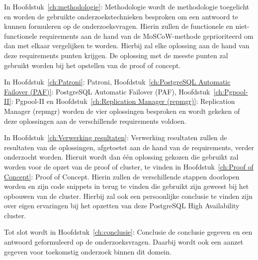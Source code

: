 In Hoofdstuk~\ref{ch:methodologie}: Methodologie wordt de methodologie toegelicht en worden de gebruikte onderzoekstechnieken besproken om een antwoord te kunnen formuleren op de onderzoeksvragen. Hierin zullen de functionele en niet-functionele requirements aan de hand van de MoSCoW-methode geprioriteerd om dan met elkaar vergelijken te worden. Hierbij zal elke oplossing aan de hand van deze requirements punten krijgen. De oplossing met de meeste punten zal gebruikt worden bij het opstellen van de proof of concept.

In Hoofdstuk~\ref{ch:Patroni}: Patroni, Hoofdstuk~\ref{ch:PostgreSQL Automatic Failover (PAF)}: PostgreSQL Automatic Failover (PAF), Hoofdstuk~\ref{ch:Pgpool-II}: Pgpool-II en Hoofdstuk~\ref{ch:Replication Manager (repmgr)}: Replication Manager (repmgr) worden de vier oplossingen besproken en wordt gekeken of deze oplossingen aan de verschillende requirements voldoen.

In Hoofdstuk~\ref{ch:Verwerking resultaten}: Verwerking resultaten zullen de resultaten van de oplossingen, afgetoetst aan de hand van de requirements, verder onderzocht worden. Hieruit wordt dan één oplossing gekozen die gebruikt zal worden voor de opzet van de proof of cluster, te vinden in Hoofdstuk~\ref{ch:Proof of Concept}: Proof of Concept. Hierin zullen de verschillende stappen doorlopen worden en zijn code snippets in terug te vinden die gebruikt zijn geweest bij het opbouwen van de cluster. Hierbij zal ook een persoonlijke conclusie te vinden zijn over eigen ervaringen bij het opzetten van deze PostgreSQL High Availability cluster.


Tot slot wordt in Hoofdstuk~\ref{ch:conclusie}: Conclusie de conclusie gegeven en een antwoord geformuleerd op de onderzoeksvragen. Daarbij wordt ook een aanzet gegeven voor toekomstig onderzoek binnen dit domein.
